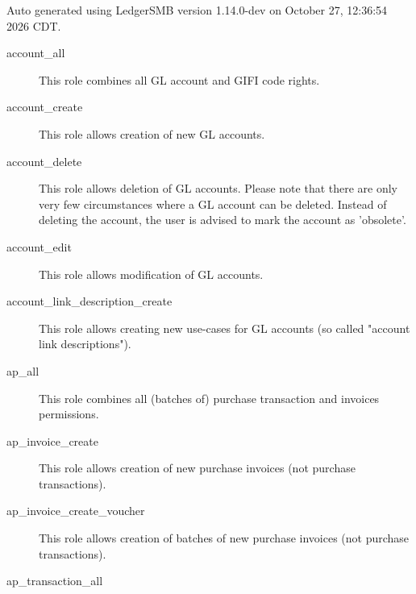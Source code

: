 
Auto generated using LedgerSMB version 1.14.0-dev on October 27, 12:36:54 2026 CDT.

\begin{description}
\item [account\_all] \htmlspacing 
                         This role combines all \gls{GL}  account and GIFI code rights.
\item [account\_create] \htmlspacing 
                         This role allows creation of new \gls{GL}  accounts.
\item [account\_delete] \htmlspacing 
                         This role allows deletion of \gls{GL}  accounts.
                         Please note that there are only very few circumstances
                         where a \gls{GL}  account can be deleted.  Instead of deleting
                         the account, the user is advised to mark the account
                         as 'obsolete'.
\item [account\_edit] \htmlspacing 
                         This role allows modification of \gls{GL}  accounts.
\item [account\_link\_description\_create] \htmlspacing 
                         This role allows creating new use-cases for \gls{GL} 
                         accounts (so called "account link descriptions").
\item [ap\_all] \htmlspacing 
                         This role combines all (batches of) purchase transaction and invoices permissions.
\item [ap\_invoice\_create] \htmlspacing 
                         This role allows creation of new purchase invoices (not purchase transactions).
\item [ap\_invoice\_create\_voucher] \htmlspacing 
                         This role allows creation of batches of new purchase invoices (not purchase transactions).
\item [ap\_transaction\_all] \htmlspacing 

\end{description}
